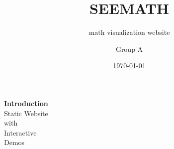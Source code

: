 \documentclass[12pt]{beamer}
\begin{document}
	\author{Group A}
	\title{SEEMATH}
	\subtitle{math visualization website}
	\date{\today}
	
	\begin{frame}[plain]
		\maketitle
	\end{frame}
	
	\begin{frame}{}	
	\begin{minipage}{0.25\linewidth}
		\noindent
		\textbf{ Introduction}\\
		\vspace{1cm}
		Static Website\\
		with\\
		Interactive \\
		Demos 
		\vspace{8cm}	\end{minipage}
	\begin{minipage}{0.7\linewidth}
	\begin{figure}
	\centering

\end{figure}
\end{minipage}
\end{frame}
\end{document}
